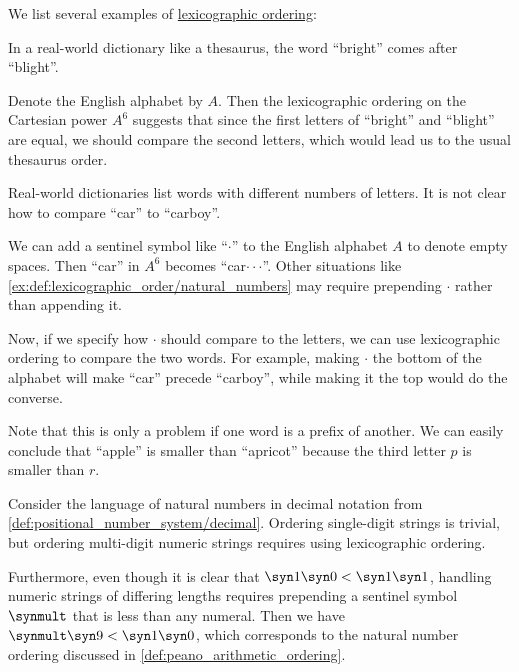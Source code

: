 \begin{example}\label{ex:def:lexicographic_order}
  We list several examples of \hyperref[def:lexicographic_order]{lexicographic ordering}:
  \begin{thmenum}
     In a real-world dictionary like a thesaurus, the word \enquote{bright} comes after \enquote{blight}.

    Denote the English alphabet by \( A \). Then the lexicographic ordering on the Cartesian power \( A^6 \) suggests that since the first letters of \enquote{bright} and \enquote{blight} are equal, we should compare the second letters, which would lead us to the usual thesaurus order.

     Real-world dictionaries list words with different numbers of letters. It is not clear how to compare \enquote{car} to \enquote{carboy}.

    We can add a sentinel symbol like \enquote{\( \cdot \)} to the English alphabet \( A \) to denote empty spaces. Then \enquote{car} in \( A^6 \) becomes \enquote{car\( \cdot \cdot \cdot \)}. Other situations like \cref{ex:def:lexicographic_order/natural_numbers} may require prepending \( \cdot \) rather than appending it.

    Now, if we specify how \( \cdot \) should compare to the letters, we can use lexicographic ordering to compare the two words. For example, making \( \cdot \) the bottom of the alphabet will make \enquote{car} precede \enquote{carboy}, while making it the top would do the converse.

    Note that this is only a problem if one word is a prefix of another. We can easily conclude that \enquote{apple} is smaller than \enquote{apricot} because the third letter \( p \) is smaller than \( r \).

     Consider the language of natural numbers in decimal notation from \cref{def:positional_number_system/decimal}. Ordering single-digit strings is trivial, but ordering multi-digit numeric strings requires using lexicographic ordering.

    Furthermore, even though it is clear that \( \syn1 \syn0 < \syn1 \syn1 \), handling numeric strings of differing lengths requires prepending a sentinel symbol \( \synmult \) that is less than any numeral. Then we have \( \synmult \syn9 < \syn1 \syn0 \), which corresponds to the natural number ordering discussed in \cref{def:peano_arithmetic_ordering}.


\end{thmenum}
\end{example}
